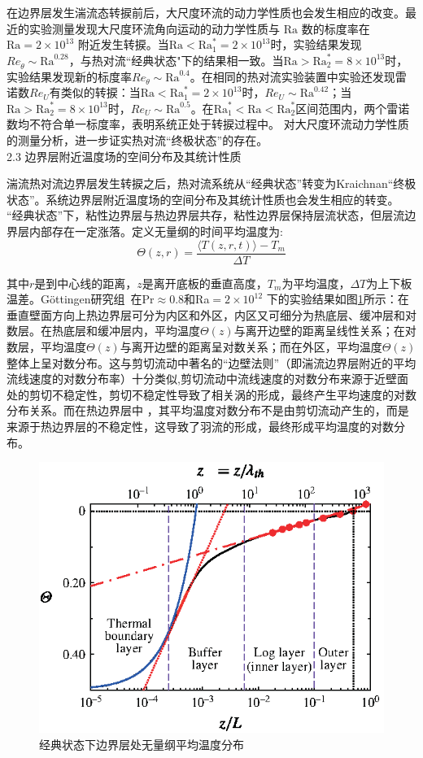 \documentclass[10pt,aps]{article}
\def\be{\begin{equation}}
\def\ee{\end{equation}}
\def\Ra{\textrm{Ra}}
\begin{document}
{在边界层发生湍流态转捩前后，大尺度环流的动力学性质也会发生相应的改变。最近的实验测量发现大尺度环流角向运动的动力学性质与 $\Ra$ 数的标度率在 $\Ra = 2 \times 10^{13}$ 附近发生转捩\cite{HBA16}。当$\Ra < \Ra_1^* = 2 \times 10^{13}$时，实验结果发现$Re_{\dot{\theta}} \sim \Ra^{0.28}$，与热对流``经典状态"下的结果相一致\cite{BA06a,BA06b}。当$\Ra > \Ra_2^* = 8 \times 10^{13}$时，实验结果发现新的标度率$Re_{\dot{\theta}} \sim \Ra^{0.4}$。在相同的热对流实验装置中实验还发现雷诺数$Re_U$有类似的转捩：当$\Ra < \Ra_1^* = 2 \times 10^{13}$时，$Re_U \sim \Ra^{0.42}$；当$\Ra > \Ra_2^* = 8 \times 10^{13}$时，$Re_U \sim \Ra^{0.5}$。在$\Ra_1^*<\Ra < \Ra_2^*$区间范围内，两个雷诺数均不符合单一标度率，表明系统正处于转捩过程中。
对大尺度环流动力学性质的测量分析，进一步证实热对流“终极状态”的存在。\\




2.3 边界层附近温度场的空间分布及其统计性质

湍流热对流边界层发生转捩之后，热对流系统从``经典状态''转变为Kraichnan``终极状态''。系统边界层附近温度场的空间分布及其统计性质也会发生相应的转变。
``经典状态''下，粘性边界层与热边界层共存，粘性边界层保持层流状态，但层流边界层内部存在一定涨落。定义无量纲的时间平均温度为:
\be
\Theta(z,r)=\frac{\langle T(z,r,t)\rangle-T_m}{\Delta T}
\ee


其中$r$是到中心线的距离，$z$是离开底板的垂直高度，$T_m$为平均温度，$\Delta T$为上下板温差。Göttingen研究组~\cite{ABFGHLSV12}\cite{ABH14}在Pr$\approx0.8$和Ra$=2×10^{12}$ 下的实验结果如图\ref{fig:LOW}所示：在垂直壁面方向上热边界层可分为内区和外区，内区又可细分为热底层、缓冲层和对数层。在热底层和缓冲层内，平均温度$\Theta(z)$与离开边壁的距离呈线性关系；在对数层，平均温度$\Theta(z)$与离开边壁的距离呈对数关系；而在外区，平均温度$\Theta(z)$整体上呈对数分布。这与剪切流动中著名的``边壁法则''（即湍流边界层附近的平均流线速度的对数分布率）十分类似,剪切流动中流线速度的对数分布来源于近壁面处的剪切不稳定性，剪切不稳定性导致了相关涡的形成，最终产生平均速度的对数分布关系。而在热边界层中 ，其平均温度对数分布不是由剪切流动产生的，而是来源于热边界层的不稳定性，这导致了羽流的形成，最终形成平均温度的对数分布。
\begin{figure}[ht]
  \centering
  \includegraphics[width=0.7\linewidth]{LOW.eps}
  \caption{经典状态下边界层处无量纲平均温度分布~\cite{ABH14}}
  \label{fig:LOW}


\end{figure}}
\end{document}
